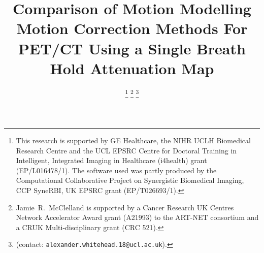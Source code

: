 \documentclass[10pt, twocolumn, twoside, letterpaper]{IEEEtran}
\begin{document}
\title{Comparison of Motion Modelling Motion Correction Methods For PET/CT Using a Single Breath Hold Attenuation Map}

\pagestyle{plain}

\author{
    
    
    
        
    \vspace{-1.0cm}

    \thanks{This research is supported by GE Healthcare, the NIHR UCLH Biomedical Research Centre and the UCL EPSRC Centre for Doctoral Training in Intelligent, Integrated Imaging in Healthcare (i4health) grant (EP/L016478/1). The software used was partly produced by the Computational Collaborative Project on Synergistic Biomedical Imaging, CCP SyneRBI, UK EPSRC grant (EP/T026693/1).}%
    \thanks{Jamie~R.~McClelland is supported by a Cancer Research UK Centres Network Accelerator Award grant (A21993) to the ART-NET consortium and a CRUK Multi-disciplinary grant (CRC 521).}%
    \thanks{(contact: \texttt{alexander.whitehead.18@ucl.ac.uk}).}%
}

\maketitle
\IEEEpeerreviewmaketitle
\end{document}
